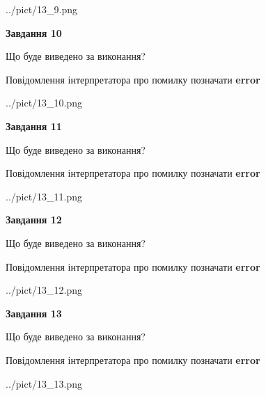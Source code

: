 \documentclass[11pt, ukrainian]{article}
\begin{document}
{\begin {large}
\begin{center}
	{../pict/13_9.png}
\end{center}
\newpage

{\begin {center}\textbf{Завдання 10}\end {center}}\par
Що буде виведено за виконання? \par
Повідомлення інтерпретатора про помилку позначати \textbf{error}

\begin{center}
	{../pict/13_10.png}
\end{center}
\newpage

{\begin {center}\textbf{Завдання 11}\end {center}}\par
Що буде виведено за виконання? \par
Повідомлення інтерпретатора про помилку позначати \textbf{error}

\begin{center}
	{../pict/13_11.png}
\end{center}
\newpage

{\begin {center}\textbf{Завдання 12}\end {center}}\par
Що буде виведено за виконання? \par
Повідомлення інтерпретатора про помилку позначати \textbf{error}

\begin{center}
	{../pict/13_12.png}
\end{center}
\newpage

{\begin {center}\textbf{Завдання 13}\end {center}}\par
Що буде виведено за виконання? \par
Повідомлення інтерпретатора про помилку позначати \textbf{error}

\begin{center}
	{../pict/13_13.png}
\end{center}
\newpage


\end{large}}
\end{document}
